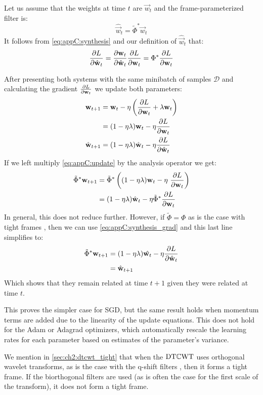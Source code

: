 Let us assume that the weights at time $t$ are $\vec{w}_t$ and the frame-parameterized
filter is:
\begin{equation}
  \hat{\vec{w}}_t = \tilde{\Phi}^* \vec{w}_t \label{eq:appC:initial_condition}
 \end{equation}
 It follows from \eqref{eq:appC:synthesis} and our definition of
 $\hat{\vec{w}}_t$ that:
\begin{equation}
  \frac{\partial L}{\partial \hat{\mathbf{w}}_t} =\frac{\partial \mathbf{w}_t}{\partial \hat{\mathbf{w}}_t} \frac{\partial L}{\partial \mathbf{w}_t} =  {\Phi}^* \frac{\partial L}{\partial \mathbf{w}_t} \label{eq:appC:synthesis_grad}
\end{equation}

After presenting both systems with the same minibatch of samples $\mathcal{D}$
and calculating the gradient $\frac{\partial L}{\partial \mathbf{w}_t}$ we update both parameters:
\begin{align}
  \mathbf{w}_{t+1} & =  \mathbf{w}_t - \eta \left( \frac{\partial L}{\partial \mathbf{w}_t} + \lambda \mathbf{w}_t \right) \\
                &= (1-\eta\lambda)\mathbf{w}_t - \eta \frac{\partial L}{\partial \mathbf{w}_t} \label{eq:appC:update} \\
  \hat{\mathbf{w}}_{t+1} & = (1-\eta\lambda)\hat{\mathbf{w}}_t - \eta \frac{\partial L}{\partial \hat{\mathbf{w}}_t} 
\end{align}
If we left multiply \eqref{eq:appC:update} by the analysis operator we get:
\begin{align}
  \tilde{\Phi}^* \mathbf{w}_{t+1} &= \tilde{\Phi}^* \left( (1-\eta\lambda){\mathbf{w}}_t - \eta\ \frac{\partial L}{\partial {\mathbf{w}}_t}\right) \\       
                               & =  (1-\eta\lambda)\hat{\mathbf{w}}_t - \eta \tilde{\Phi}^* \frac{\partial L}{\partial {\mathbf{w}}_t} 
\end{align}
In general, this does not reduce further. However, if $\tilde{\Phi} =
{\Phi}$ as is the case with tight frames \cite{kovacevic_introduction_2008},
then we can use \eqref{eq:appC:synthesis_grad} and this last line simplifies to:
\begin{align}
  \tilde{\Phi}^* \mathbf{w}_{t+1} &= (1-\eta\lambda)\hat{\mathbf{w}_t} - \eta \frac{\partial L}{\partial \hat{\mathbf{w}}_t} \\
                               &= \hat{\mathbf{w}}_{t+1}
\end{align}
Which shows that they remain related at time $t+1$ given they were
related at time $t$.

This proves the simpler case for SGD, but the same result holds when
momentum terms are added due to the linearity of the update equations. This does
not hold for the Adam \cite{kingma_adam:_2014} or Adagrad
\cite{duchi_adaptive_2011} optimizers, which automatically rescale the learning
rates for each parameter based on estimates of the parameter's variance.

We mention in \autoref{sec:ch2:dtcwt_tight} that when the $\mathrm{DT}\mathbb{C}\mathrm{WT}$ uses orthogonal
wavelet transforms, as is the case with the q-shift filters \cite{kingsbury_dual-tree_2000}, then it
forms a tight frame. If the biorthogonal filters are used (as is often the case
for the first scale of the transform), it does not form a tight frame.
